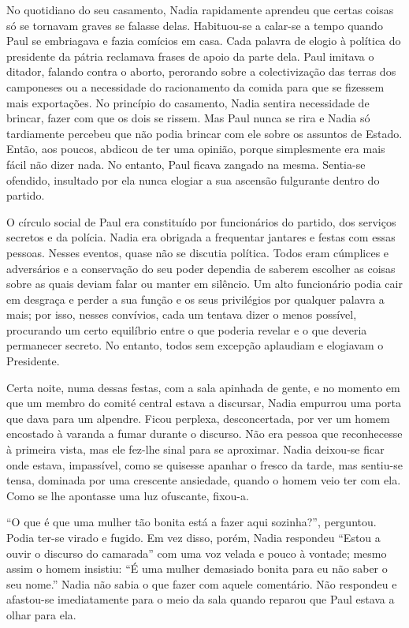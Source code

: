 No quotidiano do seu casamento, Nadia rapidamente aprendeu que certas
coisas só se tornavam graves se falasse delas. Habituou-se a calar-se a
tempo quando Paul se embriagava e fazia comícios em casa. Cada palavra
de elogio à política do presidente da pátria reclamava frases de apoio
da parte dela. Paul imitava o ditador, falando contra o aborto,
perorando sobre a colectivização das terras dos camponeses ou a
necessidade do racionamento da comida para que se fizessem mais
exportações. No princípio do casamento, Nadia sentira necessidade de
brincar, fazer com que os dois se rissem. Mas Paul nunca se rira e Nadia
só tardiamente percebeu que não podia brincar com ele sobre os assuntos
de Estado. Então, aos poucos, abdicou de ter uma opinião, porque
simplesmente era mais fácil não dizer nada. No entanto, Paul ficava
zangado na mesma. Sentia-se ofendido, insultado por ela nunca elogiar a
sua ascensão fulgurante dentro do partido.

O círculo social de Paul era constituído por funcionários do partido, dos serviços secretos e da polícia. Nadia era obrigada
a frequentar jantares e festas com essas pessoas. Nesses eventos,
quase não se discutia política. Todos eram cúmplices e adversários e a
conservação do seu poder dependia de saberem escolher as coisas sobre as
quais deviam falar ou manter em silêncio. Um alto funcionário podia cair
em desgraça e perder a sua função e os seus privilégios por qualquer
palavra a mais; por isso, nesses convívios, cada um tentava dizer o
menos possível, procurando um certo equilíbrio entre o que poderia revelar e o que deveria
permanecer secreto. No entanto, todos sem excepção aplaudiam e elogiavam
o Presidente.

Certa noite, numa dessas festas, com a sala apinhada de gente, e no
momento em que um membro do comité central estava a discursar, Nadia
empurrou uma porta que dava para um alpendre. Ficou perplexa,
desconcertada, por ver um homem encostado à varanda a fumar durante o
discurso. Não era pessoa que reconhecesse à primeira vista, mas ele
fez-lhe sinal para se aproximar. Nadia deixou-se ficar onde estava,
impassível, como se quisesse apanhar o fresco da tarde, mas sentiu-se
tensa, dominada por uma crescente ansiedade, quando o homem veio ter com
ela. Como se lhe apontasse uma luz ofuscante, fixou-a.

``O que é que uma mulher tão bonita está a fazer aqui sozinha?'',
perguntou. Podia ter-se virado e fugido. Em vez disso, porém, Nadia
respondeu ``Estou a ouvir o discurso do camarada'' com uma voz velada e
pouco à vontade; mesmo assim o homem insistiu: ``É uma mulher demasiado
bonita para eu não saber o seu nome.'' Nadia não sabia o que fazer com
aquele comentário. Não respondeu e afastou-se imediatamente para o meio
da sala quando reparou que Paul estava a olhar para ela.

